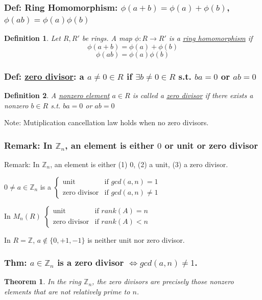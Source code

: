 \documentclass[11pt,a4paper]{article}
\newtheorem{theorem}{Theorem}
\newtheorem{definition}{Definition}
\begin{document}
\subsubsection{Def: Ring Homomorphism: $\phi(a+b)=\phi(a)+\phi(b)$, $\phi(ab)=\phi(a)\phi(b)$}
\begin{definition}
    Let $R,R'$ be rings. A map $\phi:R \rightarrow R'$ is a \underline{ring homomorphism} if $$\phi(a+b)=\phi(a)+\phi(b)$$ $$\phi(ab)=\phi(a)\phi(b)$$
\end{definition}

\subsubsection{Def: \underline{zero divisor}: a $a\neq 0\in R$ if $\exists b\neq 0\in R$ s.t. $ba=0$ or $ab=0$}
\begin{definition}
    A \underline{nonzero element} $a\in R$ is called a \underline{zero divisor} if there exists a nonzero $b\in R$ s.t. $ba=0$ or $ab=0$
\end{definition}

Note: Mutiplication cancellation law holds when no zero divisors.

\subsubsection{Remark: In $\mathbb{Z}_n$, an element is either $0$ or unit or zero divisor}
Remark: In $\mathbb{Z}_n$, an element is either (1) 0, (2) a unit, (3) a zero divisor.

$0\neq a\in \mathbb{Z}_n$ is a $\left\{\begin{matrix}
    \text{unit}&\text{if }gcd(a,n)=1\\
    \text{zero divisor}&\text{if }gcd(a,n)\neq 1
\end{matrix}\right.$

In $M_n(R)$ $\left\{\begin{matrix}
    \text{unit}&\text{if }rank(A)=n\\
    \text{zero divisor}&\text{if }rank(A)<n
\end{matrix}\right.$

In $R=\mathbb{Z}$, $a\notin\{0,+1,-1\}$ is neither unit nor zero divisor.
\subsubsection{Thm: $a\in\mathbb{Z}_n$ is a zero divisor $\Leftrightarrow gcd(a,n)\neq 1$.}
\begin{theorem}
    In the ring $\mathbb{Z}_n$, the zero divisors are precisely those nonzero elements that are not relatively prime to $n$.
\end{theorem}
\end{document}
